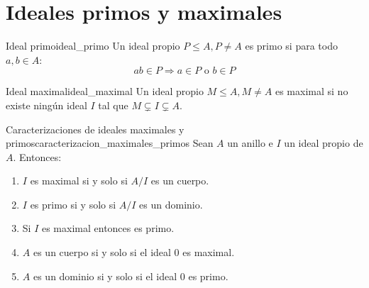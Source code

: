 \clearpage
\section{Ideales primos y maximales}

\begin{definition}{Ideal primo}{ideal_primo}
    Un ideal propio \(P \leq A, P \neq A\) es primo si para todo \(a, b \in A\):
    \[
    ab \in P \Rightarrow a \in P \text{ o } b \in P
    \]
\end{definition}

\begin{definition}{Ideal maximal}{ideal_maximal}
    Un ideal propio \(M \leq A, M \neq A\) es maximal si no existe ningún ideal \(I\) tal que \(M \subsetneq I \subsetneq A\).
\end{definition}

\begin{proposition}{Caracterizaciones de ideales maximales y primos}{caracterizacion_maximales_primos}
Sean \(A\) un anillo e \(I\) un ideal propio de \(A\). Entonces:

\begin{enumerate}
\item \(I\) es maximal si y solo si \(A/I\) es un cuerpo.

\item \(I\) es primo si y solo si \(A/I\) es un dominio.

\item Si \(I\) es maximal entonces es primo.

\item \(A\) es un cuerpo si y solo si el ideal \(0\) es maximal.

\item \(A\) es un dominio si y solo si el ideal \(0\) es primo.
\end{enumerate}

\end{proposition}

